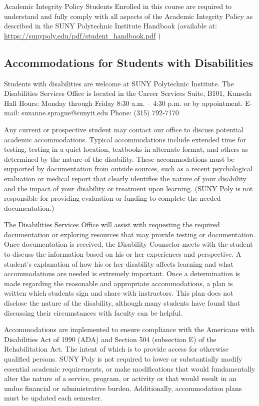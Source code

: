 \documentclass[11pt]{article}
\begin{document}
Academic Integrity Policy Students Enrolled in this course are required to understand and fully comply with all aspects of the Academic Integrity Policy as described in the SUNY Polytechnic Institute Handbook (available at:  \url{https://sunypoly.edu/pdf/student\_handbook.pdf} )

\subsection{Accommodations for Students with Disabilities}
\label{sec:org2e90ce4}

Students with disabilities are welcome at SUNY Polytechnic Institute.
The Disabilities Services Office is located in the Career Services Suite, B101, Kunsela Hall
Hours: Monday through Friday 8:30 a.m. – 4:30 p.m. or by appointment.
E-mail: suzanne.sprague@sunyit.edu
Phone: (315) 792-7170

Any current or prospective student may contact our office to discuss potential academic accommodations. Typical accommodations include extended time for testing, testing in a quiet location, textbooks in alternate format, and others as determined by the nature of the disability. These accommodations must be supported by documentation from outside sources, such as a recent psychological evaluation or medical report that clearly identifies the nature of your disability and the impact of your disability or treatment upon learning. (SUNY Poly is not responsible for providing evaluation or funding to complete the needed documentation.)

The Disabilities Services Office will assist with requesting the required documentation or exploring resources that may provide testing or documentation. Once documentation is received, the Disability Counselor meets with the student to discuss the information based on his or her experiences and perspective. A student’s explanation of how his or her disability affects learning and what accommodations are needed is extremely important. Once a determination is made regarding the reasonable and appropriate accommodations, a plan is written which students sign and share with instructors. This plan does not disclose the nature of the disability, although many students have found that discussing their circumstances with faculty can be helpful.

Accommodations are implemented to ensure compliance with the Americans with Disabilities Act of 1990 (ADA) and Section 504 (subsection E) of the Rehabilitation Act. The intent of which is to provide access for otherwise qualified persons. SUNY Poly is not required to lower or substantially modify essential academic requirements, or make modifications that would fundamentally alter the nature of a service, program, or activity or that would result in an undue financial or administrative burden. Additionally, accommodation plans must be updated each semester.
\end{document}
